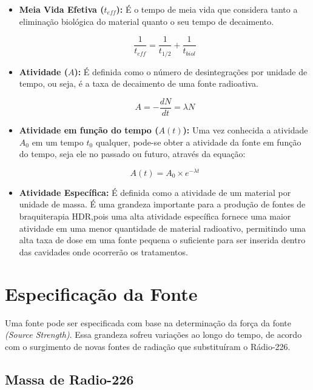 \documentclass[11pt,a4paper]{article}
\begin{document}
\begin{itemize}
			\item \textbf{Meia Vida Efetiva ($t_{eff}$): } É o tempo de meia vida que considera tanto a eliminação biológica do material quanto o seu tempo de decaimento.
			
				\begin{equation}
					\frac{1}{t_{eff}} = \frac{1}{t_{1/2}} + \frac{1}{t_{biol}}
				\end{equation}

			\item \textbf{Atividade ($A$): } É definida como o número de desintegrações por unidade de tempo, ou seja, é a taxa de decaimento de uma fonte radioativa. 
				
				\begin{equation}
					A = -\frac{dN}{dt} = \lambda N
				\end{equation}

			\item \textbf{Atividade em função do tempo ($A(t)$): } Uma vez conhecida a atividade $A_0$ em um tempo $t_0$ qualquer, pode-se obter a atividade da fonte em função do tempo, seja ele no passado ou futuro, através da equação:
				
				\begin{equation}
					A(t) = A_0 \times e^{-\lambda t}
					\label{eq:AtividadeNoTempo}
				\end{equation}

			\item \textbf{Atividade Específica: } É definida como a atividade de um material por unidade de massa. É uma grandeza importante para a produção de fontes de braquiterapia HDR,pois uma alta atividade específica fornece uma maior atividade em uma menor quantidade de material radioativo, permitindo uma alta taxa de dose em uma fonte pequena o suficiente para ser inserida dentro das cavidades onde ocorrerão os tratamentos.

		\end{itemize}

	\section{Especificação da Fonte}
		
		Uma fonte pode ser especificada com base na determinação da força da fonte \textit{(Source Strength)}. Essa grandeza sofreu variações ao longo do tempo, de acordo com o surgimento de novas fontes de radiação que substituíram o Rádio-226. 

		\subsection{Massa de Radio-226}
\end{document}
